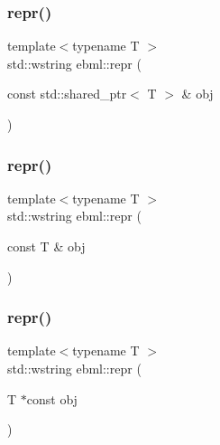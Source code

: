 \mbox{\label{namespaceebml_a5478072bc68f4104a63a83d14785c9d2}} 
\subsubsection{\texorpdfstring{repr()}{repr()}\hspace{0.1cm}{\footnotesize\ttfamily [1/10]}}
{\footnotesize\ttfamily template$<$typename T $>$ \\
std\+::wstring ebml\+::repr (\begin{DoxyParamCaption}\item[{const std\+::shared\+\_\+ptr$<$ T $>$ \&}]{obj }\end{DoxyParamCaption})}

\mbox{\label{namespaceebml_a3c5e99350812f2a7182e2de8f1e46b3b}} 
\subsubsection{\texorpdfstring{repr()}{repr()}\hspace{0.1cm}{\footnotesize\ttfamily [2/10]}}
{\footnotesize\ttfamily template$<$typename T $>$ \\
std\+::wstring ebml\+::repr (\begin{DoxyParamCaption}\item[{const T \&}]{obj }\end{DoxyParamCaption})}

\mbox{\label{namespaceebml_ac8f264e994bf8c22e2a6a9624460ddf9}} 
\subsubsection{\texorpdfstring{repr()}{repr()}\hspace{0.1cm}{\footnotesize\ttfamily [3/10]}}
{\footnotesize\ttfamily template$<$typename T $>$ \\
std\+::wstring ebml\+::repr (\begin{DoxyParamCaption}\item[{T $\ast$const}]{obj }\end{DoxyParamCaption})}

\mbox{\label{namespaceebml_a6021a6dce62f371d7ed989dc29be2599}} 
